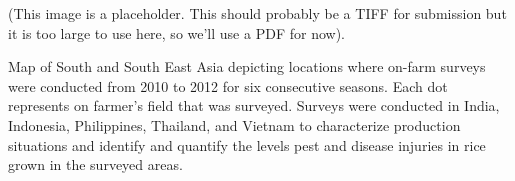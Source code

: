 (This image is a placeholder. This should probably be a TIFF for submission but it is too large to use here, so we'll use a PDF for now).

Map of South and South East Asia depicting locations where on-farm surveys were conducted from 2010 to 2012 for six consecutive seasons. Each dot represents on farmer’s field that was surveyed. Surveys were conducted in India, Indonesia, Philippines, Thailand, and Vietnam to characterize production situations and identify and quantify the levels pest and disease injuries in rice grown in the surveyed areas.